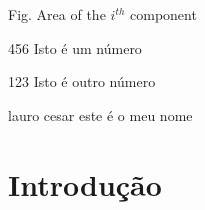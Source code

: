\documentclass[
	12pt,				%
	openright,			%
	oneside,			%
	a4paper,			%
	english,			%
	brazil,				%
	]{abntex2}
\begin{document}
\listoftables*
\cleardoublepage

\begin{siglas}
  \item[Fig.] Area of the $i^{th}$ component
  \item[456] Isto é um número
  \item[123] Isto é outro número
  \item[lauro cesar] este é o meu nome
\end{siglas}


\tableofcontents*
\cleardoublepage



\textual

\chapter[Introdução]{Introdução}


\end{document}
